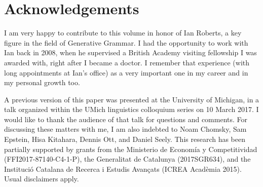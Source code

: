 \documentclass[output=paper]{langsci/langscibook}
\begin{document}
\printchapterglossary{}

\section*{Acknowledgements}

I am very happy to contribute to this volume in honor of Ian Roberts, a key
figure in the field of Generative Grammar. I had the opportunity to work with
Ian back in 2008, when he supervised a British Academy visiting fellowship I
was awarded with, right after I became a doctor. I remember that experience
(with long appointments at Ian's office) as a very important one in my career
and in my personal growth too.

A previous version of this paper was presented at the University of Michigan,
in a talk organized within the UMich linguistics colloquium series on 10 March
2017. I would like to thank the audience of that talk for questions and
comments. For discussing these matters with me, I am also indebted to Noam
Chomsky, Sam Epstein, Hisa Kitahara, Dennis Ott, and Daniel Seely. This
research has been partially supported by grants from the Ministerio de Economía
y Competitividad (FFI2017-87140-C4-1-P), the Generalitat de Catalunya
(2017SGR634), and the Institució Catalana de Recerca i Estudis Avançats
(ICREA Acadèmia 2015). Usual disclaimers apply.

{\sloppy\printbibliography[heading=subbibliography,notkeyword=this]}
\end{document}

